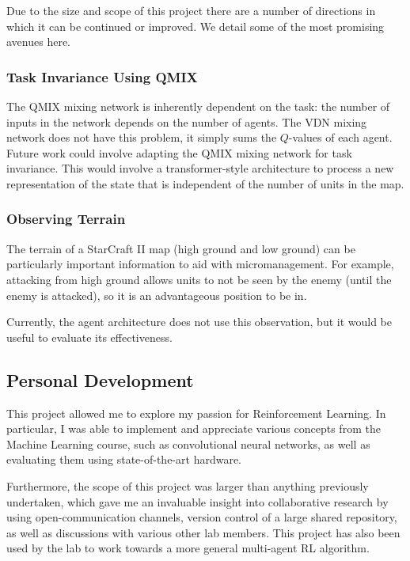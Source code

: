 Due to the size and scope of this project there are a number of directions in which it can be continued or improved. We detail some of the most promising avenues here.


\subsubsection{Task Invariance Using QMIX}

The QMIX mixing network is inherently dependent on the task: the number of inputs in the network depends on the number of agents. The VDN mixing network does not have this problem, it simply sums the $Q$-values of each agent. Future work could involve adapting the QMIX mixing network for task invariance. This would involve a transformer-style architecture to process a new representation of the state that is independent of the number of units in the map.


\subsubsection{Observing Terrain}

The terrain of a StarCraft II map (high ground and low ground) can be particularly important information to aid with micromanagement. For example, attacking from high ground allows units to not be seen by the enemy (until the enemy is attacked), so it is an advantageous position to be in.

Currently, the agent architecture does not use this observation, but it would be useful to evaluate its effectiveness.


\subsection{Personal Development}
This project allowed me to explore my passion for Reinforcement Learning. In particular, I was able to implement and appreciate various concepts from the Machine Learning course, such as convolutional neural networks, as well as evaluating them using state-of-the-art hardware.

Furthermore, the scope of this project was larger than anything previously undertaken, which gave me an invaluable insight into collaborative research by using open-communication channels, version control of a large shared repository, as well as discussions with various other lab members. This project has also been used by the lab to work towards a more general multi-agent RL algorithm.